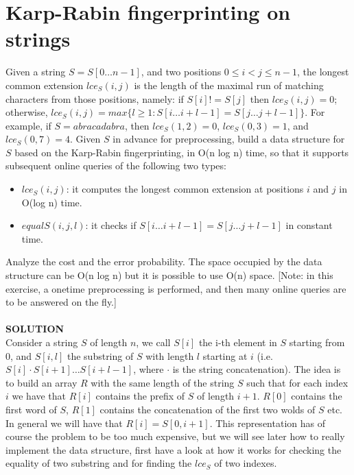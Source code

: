 \documentclass[a4paper]{article}
\begin{document}
\section*{Karp-Rabin fingerprinting on strings}
Given a string $S = S[0 \dots n − 1]$, and two positions $0 \leq i < j \leq n − 1$, the longest common extension $lce_S(i, j)$ is the length of the maximal run of matching characters from those positions, namely: if $S[i] != S[j]$ then $lce_S(i, j) = 0$; otherwise, $lce_S(i, j) =  max \{ \textit{l}\geq 1 : S[i \dots i + \textit{l} − 1] = S[j \dots j + \textit{l} − 1] \}$. For example, if $S = abracadabra$, then $lce_S(1, 2) = 0$, $lce_S(0, 3) = 1$, and $lce_S(0, 7) = 4$. Given $S$ in advance for preprocessing, build a data structure for $S$ based on the Karp-Rabin fingerprinting, in O(n log n) time, so that it supports subsequent online queries of the following two types:
\begin{itemize}
\item $lce_S(i, j)$: it computes the longest common extension at positions $i$ and $j$ in O(log n) time.
\item $equalS(i, j,\textit{l})$: it checks if $S[i \dots i + \textit{l} − 1] = S[j \dots j + \textit{l} − 1]$ in constant time.
\end{itemize}
Analyze the cost and the error probability. The space occupied by the data structure can be O(n log n) but it is possible to use O(n) space. [Note: in this exercise, a onetime preprocessing is performed, and then many online queries are to be answered on the fly.]\\
\\
\textbf{SOLUTION}
\\
Consider a string $S$ of length $n$, we call $S[i]$ the i-th element in $S$ starting from $0$, and $S[i,l]$ the substring of $S$ with length $l$ starting at $i$ (i.e. $S[i] \cdot S[i+1] \dots S[i+l-1]$, where $\cdot$ is the string concatenation). The idea is to build an array $R$ with the same length of the string $S$ such that for each index $i$ we have that $R[i]$ contains the prefix of $S$ of length $i + 1$. $R[0]$ contains the first word of $S$, $R[1]$ contains the concatenation of the first two wolds of $S$ etc. In general we will have that $R[i] = S[0,i+1]$. This representation has of course the problem to be too much expensive, but we will see later how to really implement the data structure, first have a look at how it works for checking the equality of two substring and for finding the $lce_S$ of two indexes.
\\
\\
\end{document}
